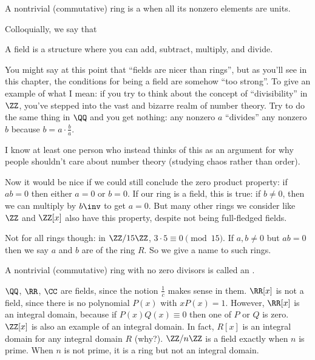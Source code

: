 \begin{definition}
	A nontrivial (commutative) ring is a 
	when all its nonzero elements are units.
\end{definition}

Colloquially, we say that
\begin{moral}
A field is a structure where you can add, subtract, multiply, and divide.
\end{moral}

\begin{remark}
	You might say at this point that ``fields are nicer than rings'',
	but as you'll see in this chapter, the conditions for
	being a field are somehow ``too strong''.
	To give an example of what I mean:
	if you try to think about the concept of ``divisibility''
	in $\ZZ$, you've stepped into the vast and bizarre realm of
	number theory.  Try to do the same thing in $\QQ$ and you get nothing:
	any nonzero $a$ ``divides'' any nonzero $b$
	because $b = a \cdot \frac ba$.

	I know at least one person who instead
	thinks of this as an argument for why people
	shouldn't care about number theory
	(studying chaos rather than order).
\end{remark}

Now it would be nice if we could still conclude the zero product property:
if $ab = 0$ then either $a = 0$ or $b = 0$.
If our ring is a field, this is true: if $b \neq 0$,
then we can multiply by $b\inv$ to get $a = 0$.
But many other rings we consider like $\ZZ$ and $\ZZ[x]$ also have this property,
despite not being full-fledged fields.

Not for all rings though: in $\ZZ/15\ZZ$, $3 \cdot 5 \equiv 0 \pmod{15}$.
If $a, b \neq 0$ but $ab=0$ then we say $a$ and $b$ are 
of the ring $R$.
So we give a name to such rings.
\begin{definition}
	A nontrivial (commutative) ring with no zero divisors
	is called an .
\end{definition}

\begin{example}
	\listhack
	\begin{enumerate}[(a)]
		\ii $\QQ$, $\RR$, $\CC$ are fields, since the notion $\frac 1c$ makes sense in them.
		\ii $\RR[x]$ is not a field, since there is no polynomial $P(x)$ with $xP(x) = 1$.
		However, $\RR[x]$ is an integral domain, because if $P(x) Q(x) \equiv 0$ then one
		of $P$ or $Q$ is zero.
		\ii $\ZZ[x]$ is also an example of an integral domain.
		In fact, $R[x]$ is an integral domain for any integral domain $R$ (why?).
		\ii $\ZZ/n\ZZ$ is a field exactly when $n$ is prime.
		When $n$ is not prime, it is a ring but not an integral domain.
	\end{enumerate}
\end{example}

